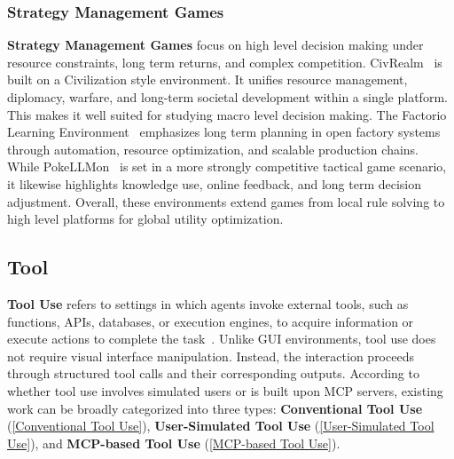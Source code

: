 \documentclass{llmxive}
\begin{document}
\subsubsection{Strategy Management Games}
\label{Strategy Management Games}
\textbf{Strategy Management Games} focus on high level decision making under resource constraints, long term returns, and complex competition. CivRealm~\cite{CivRealm} is built on a Civilization style environment. It unifies resource management, diplomacy, warfare, and long-term societal development within a single platform. This makes it well suited for studying macro level decision making. The Factorio Learning Environment~\cite{FactorioLearningEnvironment} emphasizes long term planning in open factory systems through automation, resource optimization, and scalable production chains. 
While PokeLLMon~\cite{PokeLLMon} is set in a more strongly competitive tactical game scenario, it likewise highlights knowledge use, online feedback, and long term decision adjustment. Overall, these environments extend games from local rule solving to high level platforms for global utility optimization.



\subsection{Tool}
\label{Tool}
\textbf{Tool Use} refers to settings in which agents invoke external tools, such as functions, APIs, databases, or execution engines, to acquire information or execute actions to complete the task~\cite{API-Bank,BFCL,ACEBench,ToolBench,tau-bench,UserBench,tau2-bench,MCPVerse,MCPToolBench++,MCP-Bench}. Unlike GUI environments, tool use does not require visual interface manipulation. Instead, the interaction proceeds through structured tool calls and their corresponding outputs. According to whether tool use involves simulated users or is built upon MCP servers, existing work can be broadly categorized into three types: \textbf{Conventional Tool Use} (\cref{Conventional Tool Use}), \textbf{User-Simulated Tool Use} (\cref{User-Simulated Tool Use}), and \textbf{MCP-based Tool Use} (\cref{MCP-based Tool Use}).
\end{document}
